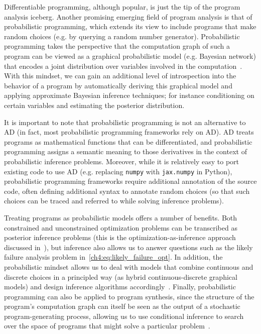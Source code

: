 Differentiable programming, although popular, is just the tip of the program analysis iceberg. Another promising emerging field of program analysis is that of probabilistic programming, which extends its view to include programs that make random choices (e.g. by querying a random number generator). Probabilistic programming takes the perspective that the computation graph of such a program can be viewed as a graphical probabilistic model (e.g. Bayesian network) that encodes a joint distribution over variables involved in the computation~\cite{woodNewApproachProbabilistic2014}. With this mindset, we can gain an additional level of introspection into the behavior of a program by automatically deriving this graphical model and applying approximate Bayesian inference techniques; for instance conditioning on certain variables and estimating the posterior distribution.

It is important to note that probabilistic programming is not an alternative to AD (in fact, most probabilistic programming frameworks rely on AD). AD treats programs as mathematical functions that can be differentiated, and probabilistic programming assigns a semantic meaning to those derivatives in the context of probabilistic inference problems. Moreover, while it is relatively easy to port existing code to use AD (e.g. replacing \texttt{numpy} with \texttt{jax.numpy} in Python), probabilistic programming frameworks require additional annotation of the source code, often defining additional syntax to annotate random choices (so that such choices can be traced and referred to while solving inference problems).

Treating programs as probabilistic models offers a number of benefits. Both constrained and unconstrained optimization problems can be transcribed as posterior inference problems (this is the optimization-as-inference approach discussed in~\cite{maSamplingCanBe2019,levineReinforcementLearningControl2018a}), but inference also allows us to answer questions such as the likely failure analysis problem in~\eqref{ch4:eq:likely_failure_opt}. In addition, the probabilistic mindset allows us to deal with models that combine continuous and discrete choices in a principled way (as hybrid continuous-discrete graphical models) and design inference algorithms accordingly~\cite{cusumano-townerGenGeneralpurposeProbabilistic2019}. Finally, probabilistic programming can also be applied to program synthesis, since the structure of the program's computation graph can itself be seen as the output of a stochastic program-generating process, allowing us to use conditional inference to search over the space of programs that might solve a particular problem~\cite{cusumano-townerAutomatingInvolutiveMCMC2020}.

